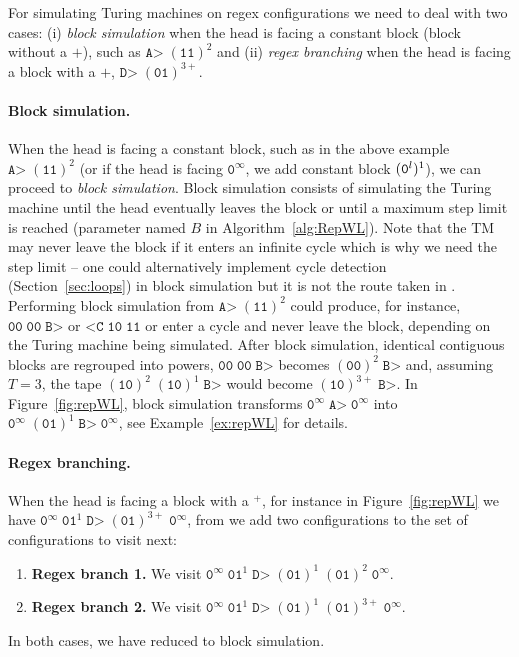 For simulating Turing machines on regex configurations we need to deal with two cases: (i) \textit{block simulation} when the head is facing a constant block (\ie block without a $+$), such as $\texttt{A>} \; (\texttt{11})^2$ and (ii) \textit{regex branching} when the head is facing a block with a $+$, \eg $\texttt{D>} \; (\texttt{01})^{3+}$.

\paragraph{Block simulation.} When the head is facing a constant block, such as in the above example $\texttt{A>} \; (\texttt{11})^2$ (or if the head is facing $\texttt{0}^\infty$, we add constant block $(\texttt{0}^l)^1$), we can proceed to \textit{block simulation}.
Block simulation consists of simulating the Turing machine until the head eventually leaves the block or until a maximum step limit is reached (parameter named $B$ in Algorithm~\ref{alg:RepWL}). Note that the TM may never leave the block if it enters an infinite cycle which is why we need the step limit -- one could alternatively implement cycle detection (Section~\ref{sec:loops}) in block simulation but it is not the route taken in \CoqBB. Performing block simulation from $\texttt{A>} \; (\texttt{11})^2$ could produce, for instance, $\texttt{00}\; \texttt{00} \; \texttt{B>}$ or $\texttt{<C} \; \texttt{10} \; \texttt{11} $ or enter a cycle and never leave the block, depending on the Turing machine being simulated. After block simulation, identical contiguous blocks are regrouped into powers, \eg $\texttt{00} \; \texttt{00} \; \texttt{B>}$ becomes $(\texttt{00})^2 \; \texttt{B>}$ and, assuming $T=3$, the tape $(\texttt{10})^2\; (\texttt{10})^1\; \texttt{B>}$ would become $(\texttt{10})^{3+}\; \texttt{B>}$. In Figure~\ref{fig:repWL}, block simulation transforms $\texttt{0}^\infty \; \texttt{A>} \; \texttt{0}^\infty$ into $\texttt{0}^\infty \; (\texttt{01})^1 \; \texttt{B>} \; \texttt{0}^\infty$, see Example~\ref{ex:repWL} for details.

\paragraph{Regex branching.} When the head is facing a block with a $^+$, for instance in Figure~\ref{fig:repWL} we have $\texttt{0}^\infty \; \texttt{01}^1 \; \texttt{D>} \; (\texttt{01})^{3+} \; \texttt{0}^\infty$, from we add two configurations to the set of configurations to visit next:
\begin{enumerate}
    \item \textbf{Regex branch 1.} We visit $\texttt{0}^\infty \; \texttt{01}^1 \; \texttt{D>} \; (\texttt{01})^1 \; (\texttt{01})^{2} \; \texttt{0}^\infty$.
    \item \textbf{Regex branch 2.} We visit $\texttt{0}^\infty \; \texttt{01}^1 \; \texttt{D>} \; (\texttt{01})^1 \; (\texttt{01})^{3+} \; \texttt{0}^\infty$.
\end{enumerate}
In both cases, we have reduced to block simulation.

